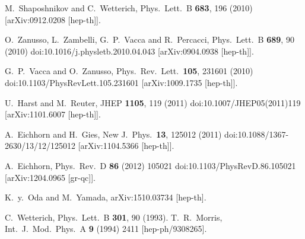 \documentclass[twocolumn,prd,superscriptaddress,preprintnumbers,amsmath,amssymb,nofootinbib]{revtex4}
\begin{document}
\begin{thebibliography}{99}
  M.~Shaposhnikov and C.~Wetterich,
  Phys.\ Lett.\ B {\bf 683}, 196 (2010)
  [arXiv:0912.0208 [hep-th]].
  
  
  O.~Zanusso, L.~Zambelli, G.~P.~Vacca and R.~Percacci,
  Phys.\ Lett.\ B {\bf 689}, 90 (2010)
  doi:10.1016/j.physletb.2010.04.043
  [arXiv:0904.0938 [hep-th]].
  
  G.~P.~Vacca and O.~Zanusso,
  Phys.\ Rev.\ Lett.\  {\bf 105}, 231601 (2010)
  doi:10.1103/PhysRevLett.105.231601
  [arXiv:1009.1735 [hep-th]].
  
  U.~Harst and M.~Reuter,
  JHEP {\bf 1105}, 119 (2011)
  doi:10.1007/JHEP05(2011)119
  [arXiv:1101.6007 [hep-th]].
  
  A.~Eichhorn and H.~Gies,
  New J.\ Phys.\  {\bf 13}, 125012 (2011)
  doi:10.1088/1367-2630/13/12/125012
  [arXiv:1104.5366 [hep-th]].
  
  A.~Eichhorn,
  Phys.\ Rev.\ D {\bf 86} (2012) 105021
  doi:10.1103/PhysRevD.86.105021
  [arXiv:1204.0965 [gr-qc]].
  
  K.~y.~Oda and M.~Yamada,
  arXiv:1510.03734 [hep-th].


 C.~Wetterich,
Phys.\ Lett.\ B {\bf 301}, 90 (1993).
 T.~R.~Morris,
 Int.\ J.\ Mod.\ Phys.\ A {\bf 9} (1994) 2411
 [hep-ph/9308265].
 
 
    

\end{thebibliography}
\end{document}
